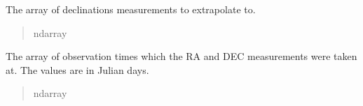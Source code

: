 \documentclass[letterpaper,11pt,english]{sphinxmanual}
\begin{document}
\begin{savenotes}
\begin{fulllineitems}
\begin{savenotes}
\begin{fulllineitems}
\begin{quote}
\begin{description}
\end{description}\end{quote}

\end{fulllineitems}\end{savenotes}


\begin{savenotes}\begin{fulllineitems}
\label{\detokenize{code/opihiexarata.propagate.polynomial:opihiexarata.propagate.polynomial.QuadraticPropagationEngine.dec_array}}
\pysigstartsignatures
{}
\pysigstopsignatures
\sphinxAtStartPar
The array of declinations measurements to extrapolate to.
\begin{quote}\begin{description}
\sphinxAtStartPar
ndarray

\end{description}\end{quote}

\end{fulllineitems}\end{savenotes}


\begin{savenotes}\begin{fulllineitems}
\label{\detokenize{code/opihiexarata.propagate.polynomial:opihiexarata.propagate.polynomial.QuadraticPropagationEngine.obs_time_array}}
\pysigstartsignatures
{}
\pysigstopsignatures
\sphinxAtStartPar
The array of observation times which the RA and DEC measurements were
taken at. The values are in Julian days.
\begin{quote}\begin{description}
\sphinxAtStartPar
ndarray

\end{description}\end{quote}

\end{fulllineitems}\end{savenotes}


\end{fulllineitems}
\end{savenotes}
\end{document}
